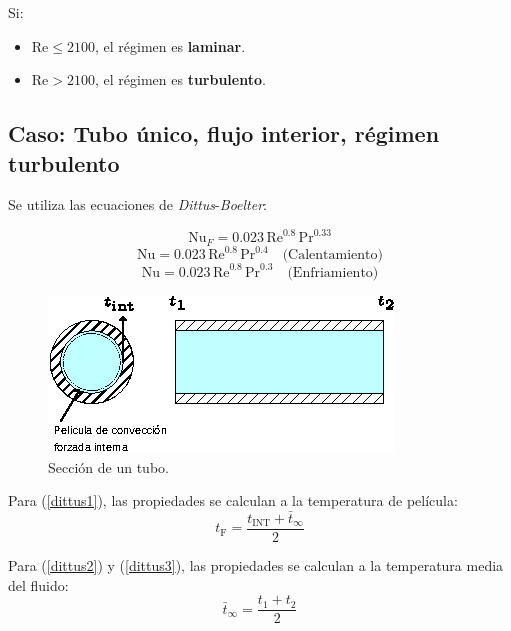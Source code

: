 Si:
\begin{itemize}
    \item $\text{Re} \le 2100$, el régimen es \textbf{laminar}.
    \item $\text{Re} > 2100$, el régimen es \textbf{turbulento}.
\end{itemize}

\subsection{Caso: Tubo único, flujo interior, régimen turbulento}
Se utiliza las ecuaciones de \emph{Dittus}-\emph{Boelter}:

\begin{equation}
    \text{Nu}_F = 0.023\,\text{Re}^{0.8}\,\text{Pr}^{0.33}
    \label{dittus1}
\end{equation}
\begin{equation}
    \text{Nu} = 0.023\,\text{Re}^{0.8}\,\text{Pr}^{0.4}
    \quad\text{(Calentamiento)}
    \label{dittus2}
\end{equation}
\begin{equation}
    \text{Nu} = 0.023\,\text{Re}^{0.8}\,\text{Pr}^{0.3}
    \quad\text{(Enfriamiento)}
    \label{dittus3}
\end{equation}

\begin{figure}[!h]
\centering
\includegraphics[scale=2.00]{figura05_02.eps}
\caption{Sección de un tubo.}
\end{figure}

Para (\ref{dittus1}), las propiedades se calculan a la temperatura de película:
\begin{equation*}
    t_\text{F} = \frac{t_\text{INT} + \bar{t}_{\infty}}{2}
\end{equation*}

Para (\ref{dittus2}) y (\ref{dittus3}), las propiedades se calculan a la
temperatura media del fluido:
\begin{equation*}
    \bar{t}_\infty = \frac{t_1 + t_2}{2}
\end{equation*}

